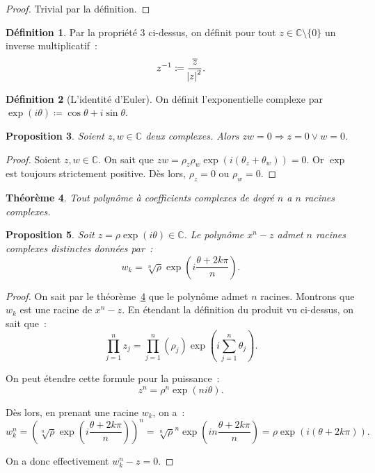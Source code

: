 \documentclass{article}
\newcommand{\C}{\mathbb C}
\newtheorem{thm}{Théorème}[section]
\newtheorem{prp}[thm]{Proposition}
\theoremstyle{definition}
\newtheorem{déf}[thm]{Définition}
\theoremstyle{remark}
\begin{document}
		\begin{proof} Trivial par la définition. \end{proof}

		\begin{déf} Par la propriété 3 ci-dessus, on définit pour tout $z \in \C \setminus \{0\}$ un inverse multiplicatif~:
		\[z^{-1} \coloneqq \frac {\overline z}{\abs z^2}.\] \end{déf}

		\begin{déf}[L'identité d'Euler] On définit l'exponentielle complexe par $\exp(i\theta) \coloneqq \cos\theta + i\sin\theta$. \end{déf}

		\begin{prp} Soient $z, w \in \C$ deux complexes. Alors $zw = 0 \Rightarrow z=0 \lor w=0$. \end{prp}

		\begin{proof} Soient $z, w \in \C$. On sait que $zw = \rho_z\rho_w\exp(i(\theta_z+\theta_w)) = 0$. Or $\exp$ est toujours strictement positive.
		Dès lors, $\rho_z=0$ ou $\rho_w=0$. \end{proof}

		\begin{thm}\label{thmFondamental} Tout polynôme à coefficients complexes de degré $n$ a $n$ racines complexes. \end{thm}

		\begin{prp} Soit $z = \rho \exp(i\theta) \in \C$. Le polynôme $x^n - z$ admet $n$ racines complexes distinctes données par~:
		\[w_k = \sqrt[n]\rho\exp\left(i\frac {\theta+2k\pi}n\right).\]\end{prp}

		\begin{proof} On sait par le théorème~\ref{thmFondamental} que le polynôme admet $n$ racines. Montrons que $w_k$ est une racine de $x^n-z$. En étendant la
		définition du produit vu ci-dessus, on sait que~: \[\prod_{j=1}^nz_j = \prod_{j=1}^n(\rho_j)\exp\left(i\sum_{j=1}^n\theta_j\right).\]

		On peut étendre cette formule pour la puissance~: \[z^n = \rho^n\exp(ni\theta).\]

		Dès lors, en prenant une racine $w_k$, on a~:
		\[w_k^n = \left(\sqrt[n]\rho\exp\left(i\frac {\theta+2k\pi}n\right)\right)^n = \sqrt[n]\rho^n\exp\left(in\frac {\theta+2k\pi}n\right) = \rho\exp(i(\theta+2k\pi)).\]

		On a donc effectivement $w_k^n-z = 0$. \end{proof}
\end{document}
